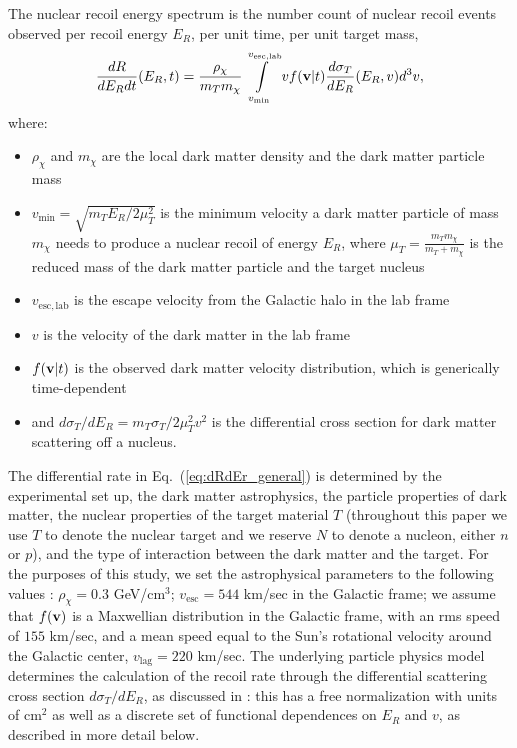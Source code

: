 \documentclass[11pt]{article}
\newcommand{\Eq}[1]{Eq.~(\ref{#1})} \newcommand{\Eqs}[2]{Eqs.~(\ref{#1}) and (\ref{#2})} \newcommand{\Eqm}[2]{Eqs.~(\ref{#1}) through (\ref{#2})}
\begin{document}
The nuclear recoil energy spectrum is the number count of nuclear recoil events observed per recoil energy $E_R$, per unit time, per unit target mass,
\begin{equation}
\frac{dR}{dE_R dt}(E_R,t) =  \frac{\rho_\chi}{m_T m_\chi} \int\limits_{v_{\mathrm{min}}}^{v_{\mathrm{esc, lab}}}  v f(\mathrm{\mbox{\bf{v}}}|t) \frac{d\sigma_T}{dE_R} (E_R,v) d^3v ,
\label{eq:dRdEr_general}
\end{equation}
where:
\begin{itemize}
\item $\rho_\chi$ and $m_\chi$ are the local dark matter density and the dark matter particle mass
\item $v_\mathrm{min} = \sqrt{m_T E_R/2\mu_T^2}$ is the minimum velocity a dark matter particle of mass $m_\chi$ needs to produce a nuclear recoil of energy $E_R$, where $\mu_T=\frac{m_Tm_\chi}{m_T+m_\chi}$ is the reduced mass of the dark matter particle and the target nucleus
\item $v_{\mathrm{esc, lab}}$ is the escape velocity from the Galactic halo in the lab frame
\item $v$ is the velocity of the dark matter in the lab frame
\item $f(\mathrm{\mbox{\bf{v}}}|t)$ is the observed dark matter velocity distribution, which is generically time-dependent
\item and $d\sigma_T/dE_R=m_T \sigma_T /2\mu_T^2 v^2$ is the differential cross section for dark matter scattering off a nucleus.
\end{itemize}
The differential rate in \Eq{eq:dRdEr_general} is determined by the experimental set up, the dark matter astrophysics, the particle properties of dark matter, the nuclear properties of the target material $T$ (throughout this paper we use $T$ to denote the nuclear target and we reserve $N$ to denote a nucleon, either $n$ or $p$), and the type of interaction between the dark matter and the target. For the purposes of this study, we set the astrophysical parameters to the following values \cite{Bovy:2013raa}: $\rho_\chi=0.3$ GeV/cm$^3$; $v_{\mathrm{esc}} = 544$ km/sec in the Galactic frame; we assume that $f(\mathrm{\mbox{\bf{v}}})$ is a Maxwellian distribution in the Galactic frame, with an rms speed of $155$ km/sec, and a mean speed equal to the Sun's rotational velocity around the Galactic center, $v_\textrm{lag}=220$ km/sec. The underlying particle physics model determines the calculation of the recoil rate through the differential scattering cross section ${d\sigma_T}/{dE_R}$, as discussed in \cite{Gluscevic:2015sqa,Gresham:2014vja}: this has a free normalization with units of cm${}^2$ as well as a discrete set of functional dependences on $E_R$ and $v$, as described in more detail below.
\end{document}
